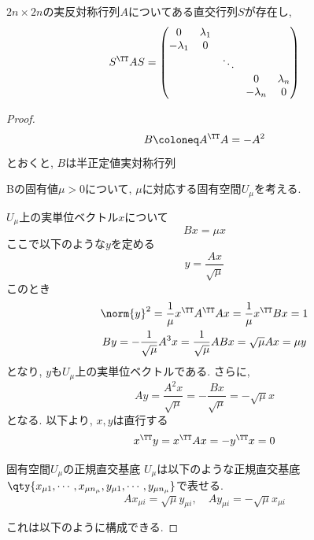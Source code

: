\documentclass[a4paper,12pt]{jlreq}
\begin{document}
\begin{theotcolorbox}[title = 補題A]
    $2n\times 2n$の実反対称行列$A$についてある直交行列$S$が存在し,
    \begin{equation}
        S^{\TT}AS = \begin{pmatrix}
            0 & \lambda_1 & & & \\
            -\lambda_1 & 0 & & & \\
             & & \ddots & & \\
            & & & 0 & \lambda_n \\
            & & & -\lambda_n & 0
        \end{pmatrix}
    \end{equation}
\end{theotcolorbox}

\begin{proof}
    \begin{equation}
        B \coloneq A^{\TT}A = -A^2
    \end{equation}
    とおくと, $B$は半正定値実対称行列

    Bの固有値$\mu >0$について, $\mu$に対応する固有空間$U_{\mu}$を考える.
    
    $U_{\mu}$上の実単位ベクトル$x$について
    \begin{equation}
        Bx = \mu x
    \end{equation}
    ここで以下のような$y$を定める
    \begin{equation}
        y = \frac{Ax}{\sqrt{\mu}}
    \end{equation}
    このとき
    \begin{gather}
        \norm{y}^2 = \frac{1}{\mu}x^{\TT}A^{\TT} A x = \frac{1}{\mu}x^{\TT}B x = 1\\
        B y = -\frac{1}{\sqrt{\mu}} A^3 x = \frac{1}{\sqrt{\mu}} A Bx = \sqrt{\mu} A x = \mu y
    \end{gather}
    となり, $y$も$U_{\mu}$上の実単位ベクトルである. さらに, 
    \begin{equation}
        Ay = \frac{A^2x}{\sqrt{\mu}} = -\frac{Bx}{\sqrt{\mu}} = -\sqrt{\mu} x
    \end{equation}
    となる. 以下より, $x,y$は直行する
    \begin{equation}
        x^{\TT}y = x^{\TT}Ax = - y^{\TT}x = 0
    \end{equation}
    \begin{itembox}[l]{固有空間$U_{\mu}$の正規直交基底}
    $U_{\mu}$は以下のような正規直交基底$\qty{x_{\mu 1},\cdots,x_{\mu n_{\mu}}, y_{\mu 1},\cdots,y_{\mu n_{\mu}}}$で表せる.
    \begin{equation}
        A x_{\mu i} = \sqrt{\mu} y_{\mu i},\quad A y_{\mu i} = - \sqrt{\mu} x_{\mu i}
    \end{equation}
    \end{itembox}
    これは以下のように構成できる. 


\end{proof}
\end{document}
